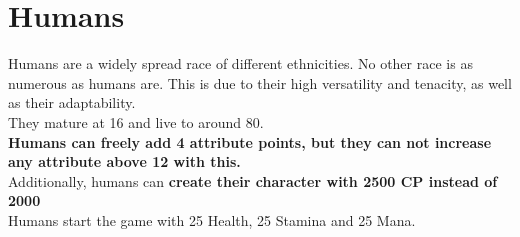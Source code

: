 \section{Humans}\label{race:human}
Humans are a widely spread race of different ethnicities.
No other race is as numerous as humans are.
This is due to their high versatility and tenacity, as well as their adaptability.\\
They mature at 16 and live to around 80.\\
\textbf{Humans can freely add 4 attribute points, but they can not increase any attribute above 12 with this.}\\
Additionally, humans can \textbf{create their character with 2500 CP instead of 2000}\\ 
Humans start the game with 25 Health, 25 Stamina and 25 Mana.